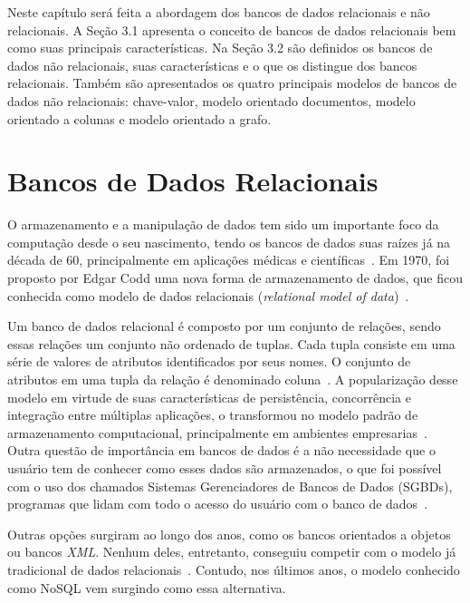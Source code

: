 Neste capítulo será feita a abordagem dos bancos de dados relacionais e não relacionais. A Seção 3.1 apresenta o conceito de bancos de dados relacionais bem como suas principais características. Na Seção 3.2 são definidos os bancos de dados não relacionais, suas características e o que os distingue dos bancos relacionais. Também são apresentados os quatro principais modelos de bancos de dados não relacionais: chave-valor, modelo orientado documentos, modelo orientado a colunas e modelo orientado a grafo.

\section{Bancos de Dados Relacionais}
O armazenamento e a manipulação de dados tem sido um importante foco da computação desde o seu nascimento, tendo os bancos de dados suas raízes já na década de 60, principalmente em aplicações médicas e científicas~\cite{neufeld1986database}. Em 1970, foi proposto por Edgar Codd uma nova forma de armazenamento de dados, que ficou conhecida como modelo de dados relacionais (\emph{relational model of data})~\cite{codd1970relational}. 

Um banco de dados relacional é composto por um conjunto de relações, sendo essas relações um conjunto não ordenado de tuplas. Cada tupla consiste em uma série de valores de atributos identificados por seus nomes. O conjunto de atributos em uma tupla da relação é denominado coluna~\cite{heuser}. A popularização desse modelo em virtude de suas características de persistência, concorrência e integração entre múltiplas aplicações, o transformou no modelo padrão de armazenamento computacional, principalmente em ambientes empresarias~\cite{pramod}. Outra questão de importância em bancos de dados é a não necessidade que o usuário tem de conhecer como esses dados são armazenados, o que foi possível com o uso dos chamados Sistemas Gerenciadores de Bancos de Dados (SGBDs), programas que lidam com todo o acesso do usuário com o banco de dados~\cite{jan, cjdate}.

Outras opções surgiram ao longo dos anos, como os bancos orientados a objetos ou bancos \emph{XML}. Nenhum deles, entretanto, conseguiu competir com o modelo já tradicional de dados relacionais~\cite{pramod}. Contudo, nos últimos anos, o modelo conhecido como NoSQL vem surgindo como essa alternativa.


